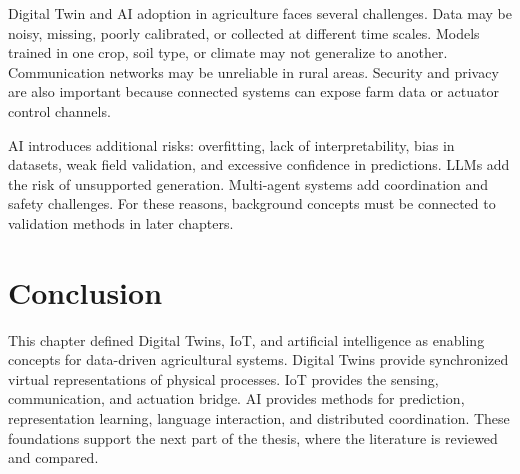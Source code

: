 Digital Twin and AI adoption in agriculture faces several challenges. Data may be noisy, missing, poorly calibrated, or collected at different time scales. Models trained in one crop, soil type, or climate may not generalize to another. Communication networks may be unreliable in rural areas. Security and privacy are also important because connected systems can expose farm data or actuator control channels.

AI introduces additional risks: overfitting, lack of interpretability, bias in datasets, weak field validation, and excessive confidence in predictions. LLMs add the risk of unsupported generation. Multi-agent systems add coordination and safety challenges. For these reasons, background concepts must be connected to validation methods in later chapters.

\section{Conclusion}

This chapter defined Digital Twins, IoT, and artificial intelligence as enabling concepts for data-driven agricultural systems. Digital Twins provide synchronized virtual representations of physical processes. IoT provides the sensing, communication, and actuation bridge. AI provides methods for prediction, representation learning, language interaction, and distributed coordination. These foundations support the next part of the thesis, where the literature is reviewed and compared.
